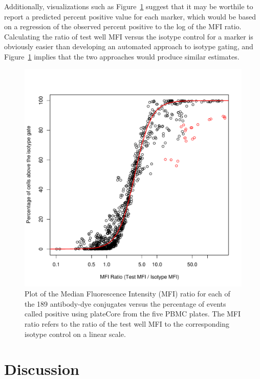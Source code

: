 \documentclass[12pt]{article}
\begin{document}
Additionally, visualizations such as Figure~\ref{fig:mfiRatio} suggest that it
may be worthile to report a predicted percent positive value for each marker,
which would be based on a regression of the observed percent positive to the
log of the MFI ratio. Calculating the ratio of test well MFI versus the isotype
control for a marker is obviously easier than developing an automated approach
to isotype gating, and Figure~\ref{fig:mfiRatio} implies that the two
approaches would produce similar estimates.

\begin{figure}
\centering
\includegraphics{mfiRatio.pdf}
\caption{Plot of the Median Fluorescence Intensity (MFI) ratio for each of the
189 antibody-dye conjugates versus the percentage of events called positive
using plateCore from the five PBMC plates. The MFI ratio refers to the ratio of
the test well MFI to the corresponding isotype control on a linear scale.
}
\label{fig:mfiRatio}
\end{figure}


\clearpage
\section*{Discussion}
\end{document}
